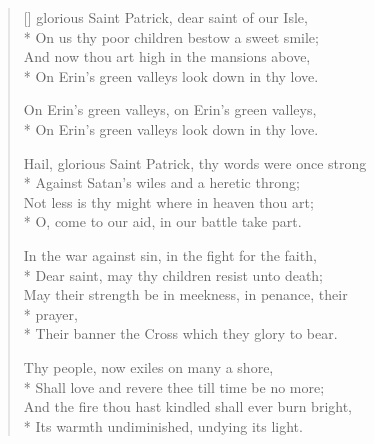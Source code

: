 
\newHymn

\begin{verse}[\versewidth]
 glorious Saint Patrick, dear saint of our Isle,\\*
        On us thy poor children bestow a sweet smile;\\
        And now thou art high in the mansions above,\\*
        On Erin's green valleys look down in thy love.

\begin{indentedVerse}
\vin On Erin's green valleys, on Erin's green valleys,\\*
\vin        On Erin's green valleys look down in thy love.
\end{indentedVerse}

Hail, glorious Saint Patrick, thy words were once strong\\*
        Against Satan's wiles and a heretic throng;\\
        Not less is thy might where in heaven thou art;\\*
        O, come to our aid, in our battle take part.


In the war against sin, in the fight for the faith,\\*
        Dear saint, may thy children resist unto death;\\
        May their strength be in meekness, in penance, their\\*
            \vin prayer,\\*
        Their banner the Cross which they glory to bear.
 

Thy people, now exiles on many a shore,\\*
        Shall love and revere thee till time be no more;\\
        And the fire thou hast kindled shall ever burn bright,\\*
        Its warmth undiminished, undying its light.


\end{verse}
